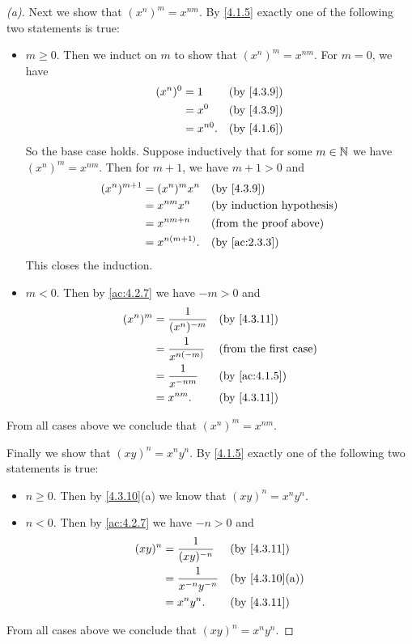 \begin{proof}[(a)]
  Next we show that \((x^n)^m = x^{nm}\).
  By \cref{4.1.5} exactly one of the following two statements is true:
  \begin{itemize}
    \item \(m \geq 0\).
          Then we induct on \(m\) to show that \((x^n)^m = x^{nm}\).
          For \(m = 0\), we have
          \begin{align*}
            (x^n)^0 & = 1       &  & \by{4.3.9} \\
                    & = x^0     &  & \by{4.3.9} \\
                    & = x^{n0}. &  & \by{4.1.6}
          \end{align*}
          So the base case holds.
          Suppose inductively that for some \(m \in \mathbb{N}\) we have \((x^n)^m = x^{nm}\).
          Then for \(m + 1\), we have \(m + 1 > 0\) and
          \begin{align*}
            (x^n)^{m + 1} & = (x^n)^m x^n   &  & \by{4.3.9}                    \\
                          & = x^{nm} x^n    &  & \byIH                         \\
                          & = x^{nm + n}    &  & \text{(from the proof above)} \\
                          & = x^{n(m + 1)}. &  & \by{ac:2.3.3}
          \end{align*}
          This closes the induction.
    \item \(m < 0\).
          Then by \cref{ac:4.2.7} we have \(-m > 0\) and
          \begin{align*}
            (x^n)^m & = \dfrac{1}{(x^n)^{-m}} &  & \by{4.3.11}                  \\
                    & = \dfrac{1}{x^{n(-m)}}  &  & \text{(from the first case)} \\
                    & = \dfrac{1}{x^{-nm}}    &  & \by{ac:4.1.5}                \\
                    & = x^{nm}.               &  & \by{4.3.11}
          \end{align*}
  \end{itemize}
  From all cases above we conclude that \((x^n)^m = x^{nm}\).

  Finally we show that \((xy)^n = x^n y^n\).
  By \cref{4.1.5} exactly one of the following two statements is true:
  \begin{itemize}
    \item \(n \geq 0\).
          Then by \cref{4.3.10}(a) we know that \((xy)^n = x^n y^n\).
    \item \(n < 0\).
          Then by \cref{ac:4.2.7} we have \(-n > 0\) and
          \begin{align*}
            (xy)^n & = \dfrac{1}{(xy)^{-n}}     &  & \by{4.3.11}    \\
                   & = \dfrac{1}{x^{-n} y^{-n}} &  & \by{4.3.10}[a] \\
                   & = x^n y^n.                 &  & \by{4.3.11}
          \end{align*}
  \end{itemize}
  From all cases above we conclude that \((xy)^n = x^n y^n\).
\end{proof}

